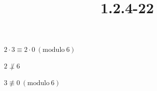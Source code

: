 \documentclass{article}
\title{1.2.4-22}
\begin{document}
\maketitle

$2 \cdot 3 \equiv 2 \cdot 0\ (\mathrm{modulo}\ 6)$

$2 \not\perp 6$

$3 \not\equiv 0\ (\mathrm{modulo}\ 6)$
\end{document}
